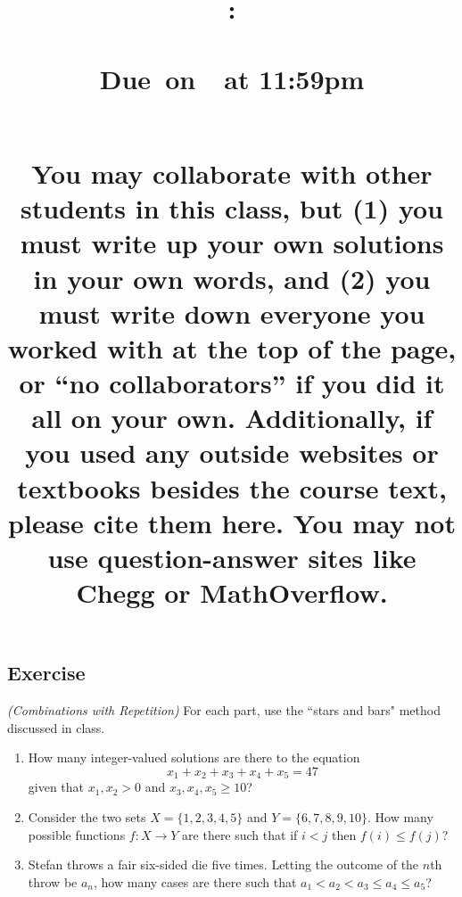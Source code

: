 \documentclass{article}
\title{
    \vspace{1in}
    \textbf{\hmwkClass:\\ \hmwkTitle} \\
    \normalsize\vspace{0.1in}\small{Due\ on\ \hmwkDueDate\ at 11:59pm} \\
    \vspace{0.1in}\large{\textit{\hmwkClassInstructor\ \hmwkSection}} \\
    \vspace{1in}
    \begin{minipage}[t]{0.5\columnwidth}
    {\footnotesize You may collaborate with other students in this class, but (1) you must write up your own solutions in your own words, and (2) you must write down everyone you worked with at the top of the page, or ``no collaborators'' if you did it all on your own. Additionally, if you used any outside websites or textbooks besides the course text, please cite them here. You may not use question-answer sites like Chegg or MathOverflow.}
    \end{minipage}
    \vspace{1in}
    \author{\textbf{\hmwkAuthorName}}
    \date{}
}
\newcounter{counter}
\newcommand{\Exercise}{Exercise \stepcounter{counter}\thecounter}
\begin{document}
\maketitle
\pagebreak

\subsection*{\Exercise}
    \textit{(Combinations with Repetition) } For each part, use the ``stars and bars" method discussed in class.
    \begin{enumerate}
        \item How many integer-valued solutions are there to the equation $$x_{1} + x_{2} + x_{3} + x_{4} + x_{5} = 47$$ given that $x_{1}, x_{2} > 0$ and $x_{3}, x_{4}, x_{5} \ge 10$?
        \item Consider the two sets $X = \{1, 2, 3, 4, 5\}$ and $Y = \{6, 7, 8, 9, 10\}$. How many possible functions $f : X \rightarrow Y$ are there such that if $i < j$ then $f(i) \le f(j)$?
        \item Stefan throws a fair six-sided die five times. Letting the outcome of the $n$th throw be $a_{n}$, how many cases are there such that $a_{1} < a_{2} < a_{3} \le a_{4} \le a_{5}$?
    \end{enumerate}
\end{document}
